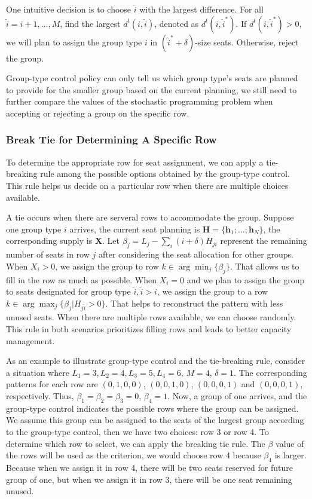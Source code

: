 One intuitive decision is to choose $\hat{i}$ with the largest difference. For all $\hat{i} = {i}+1, \ldots, M$, find the largest $d^{t}({i},\hat{i})$, denoted as $d^{t}({i},\hat{i}^{*})$. If $d^{t}({i},\hat{i}^{*}) >0$, we will plan to assign the group type ${i}$ in $(\hat{i}^{*}+\delta)$-size seats. Otherwise, reject the group.

Group-type control policy can only tell us which group type's seats are planned to provide for the smaller group based on the current planning, we still need to further compare the values of the stochastic programming problem when accepting or rejecting a group on the specific row. 

\subsubsection{Break Tie for Determining A Specific Row}\label{tie-break}
To determine the appropriate row for seat assignment, we can apply a tie-breaking rule among the possible options obtained by the group-type control. This rule helps us decide on a particular row when there are multiple choices available.

A tie occurs when there are serveral rows to accommodate the group. Suppose one group type ${i}$ arrives, the current seat planning is $\bm{H} = \{\bm{h}_{1}; \ldots; \bm{h}_{N}\}$, the corresponding supply is $\bm{X}$. Let $\beta_{j} = L_j - \sum_{i} (i+\delta) H_{ji}$ represent the remaining number of seats in row $j$ after considering the seat allocation for other groups. When $X_{i} > 0$, we assign the group to row $k \in \arg \min_{j} \{\beta_{j}\}$. That allows us to fill in the row as much as possible. When $X_{i} = 0$ and we plan to assign the group to seats designated for group type $\hat{i}, \hat{i}>i$, we assign the group to a row $k \in \arg \max_{j} \{\beta_{j}| H_{j \hat{i}}>0\}$. That helps to reconstruct the pattern with less unused seats. When there are multiple rows available, we can choose randomly. This rule in both scenarios prioritizes filling rows and leads to better capacity management.

As an example to illustrate group-type control and the tie-breaking rule, consider a situation where $L_1 =3, L_2 = 4, L_3 =5, L_4 =6$, $M =4$, $\delta =1$. The corresponding patterns for each row are $(0,1,0,0)$, $(0,0,1,0)$, $(0,0,0,1)$ and $(0,0,0,1)$, respectively. Thus, $\beta_1 = \beta_2 = \beta_3 =0$, $\beta_4 =1$. Now, a group of one arrives, and the group-type control indicates the possible rows where the group can be assigned. We assume this group can be assigned to the seats of the largest group according to the group-type control, then we have two choices: row 3 or row 4. To determine which row to select, we can apply the breaking tie rule. The $\beta$ value of the rows will be used as the criterion, we would choose row 4 because $\beta_4$ is larger. Because when we assign it in row 4, there will be two seats reserved for future group of one, but when we assign it in row 3, there will be one seat remaining unused.

